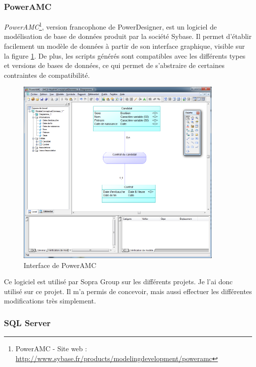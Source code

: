 
\subsubsection{PowerAMC}

\textit{PowerAMC}\footnote{PowerAMC - Site web : \url{http://www.sybase.fr/products/modelingdevelopment/poweramc}}, version francophone de PowerDesigner, est un logiciel de modélisation de base de données produit par la société Sybase.
Il permet d'établir facilement un modèle de données à partir de son interface graphique, visible sur la figure \ref{PowerAMC}.
De plus, les scripts générés sont compatibles avec les différents types et versions de bases de données, ce qui permet de s'abstraire de certaines contraintes de compatibilité.
\begin{figure}[!h]
	\center
	\includegraphics[width=0.9\textwidth]{img/PowerAMC.png}
	\caption{Interface de PowerAMC}
	\label{PowerAMC}
\end{figure}

Ce logiciel est utilisé par Sopra Group sur les différents projets.
Je l'ai donc utilisé sur ce projet.
Il m'a permis de concevoir, mais aussi effectuer les différentes modifications très simplement.


\subsubsection{SQL Server}

